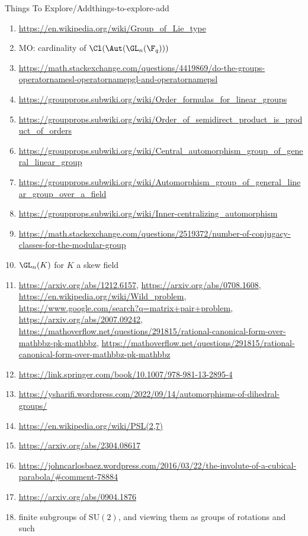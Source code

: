 \begin{remark}{Things To Explore/Add}{things-to-explore-add}
\begin{enumerate}
        \item \url{https://en.wikipedia.org/wiki/Group\_of\_Lie\_type}
        \item MO: cardinality of $\Cl(\Aut(\GL_{n}(\F_{q})))$
        \item \url{https://math.stackexchange.com/questions/4419869/do-the-groups-operatornamesl-operatornamepgl-and-operatornamepsl}
        \item \url{https://groupprops.subwiki.org/wiki/Order\_formulas\_for\_linear\_groups}
        \item \url{https://groupprops.subwiki.org/wiki/Order\_of\_semidirect\_product\_is\_product\_of\_orders}
        \item \url{https://groupprops.subwiki.org/wiki/Central\_automorphism\_group\_of\_general\_linear\_group}
        \item \url{https://groupprops.subwiki.org/wiki/Automorphism\_group\_of\_general\_linear\_group\_over\_a\_field}
        \item \url{https://groupprops.subwiki.org/wiki/Inner-centralizing\_automorphism}
        \item \url{https://math.stackexchange.com/questions/2519372/number-of-conjugacy-classes-for-the-modular-group}
        \item $\GL_{n}(K)$ for $K$ a skew field
        \item \url{https://arxiv.org/abs/1212.6157}, \url{https://arxiv.org/abs/0708.1608}, \url{https://en.wikipedia.org/wiki/Wild\_problem}, \url{https://www.google.com/search?q=matrix+pair+problem}, \url{https://arxiv.org/abs/2007.09242}, \url{https://mathoverflow.net/questions/291815/rational-canonical-form-over-mathbbz-pk-mathbbz}, \url{https://mathoverflow.net/questions/291815/rational-canonical-form-over-mathbbz-pk-mathbbz}
        \item \url{https://link.springer.com/book/10.1007/978-981-13-2895-4}
        \item \url{https://ysharifi.wordpress.com/2022/09/14/automorphisms-of-dihedral-groups/}
        \item \url{https://en.wikipedia.org/wiki/PSL(2,7)}
        \item \url{https://arxiv.org/abs/2304.08617}
        \item \url{https://johncarlosbaez.wordpress.com/2016/03/22/the-involute-of-a-cubical-parabola/\#comment-78884}
        \item \url{https://arxiv.org/abs/0904.1876}
        \item finite subgroups of $\mathrm{SU}(2)$, and viewing them as groups of rotations and such

\end{enumerate}
\end{remark}
